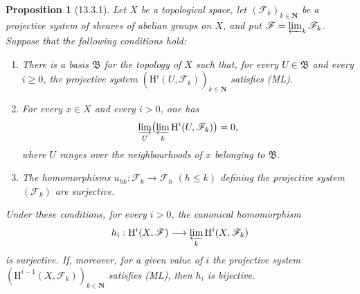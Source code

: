\documentclass[oneside]{amsart}
\theoremstyle{ega-env-style}
\theoremstyle{ega-thm-env-style}
\newtheorem*{proposition}{Proposition}
\theoremstyle{ega-defn-env-style}
\def\mathcal{\mathscr}
\def\sh{\mathcal}                   %
\def\bb{\mathbf}                    %
\def\leq{\leqslant}                 %
\def\geq{\geqslant}                 %
\def\HH{\mathrm{H}}                 %
\newcommand{\oldpage}[2][]{{\marginnote{\normalfont{\textbf{#1}~|~#2}}}\ignorespaces}
\let\EGAOriginalLabel\label
\renewcommand{\label}[1]{\phantomsection\EGAOriginalLabel{#1}}
\begin{document}
\begin{proposition}[13.3.1]
\label{0.13.3.1}
\oldpage[0\textsubscript{III}]{68}
Let $X$ be a topological space, let
$(\sh{F}_k)_{k\in\bb{N}}$ be a projective system of sheaves of
abelian groups on $X$, and put
$\sh{F}=\varprojlim_k\sh{F}_k$.
Suppose that the following conditions hold:
\begin{enumerate}
  \item[{\rm(i)}]
  There is a basis $\mathfrak{B}$ for the topology of $X$ such that,
  for every $U\in\mathfrak{B}$ and every $i\geq0$, the projective
  system
  $(\HH^i(U,\sh{F}_k))_{k\in\bb{N}}$ satisfies (ML).

  \item[{\rm(ii)}]
  For every $x\in X$ and every $i>0$, one has
  \[
    \varinjlim_U\bigl(\varprojlim_k
    \HH^i(U,\sh{F}_k)\bigr)=0,
  \]
  where $U$ ranges over the neighbourhoods of $x$ belonging to
  $\mathfrak{B}$.

  \item[{\rm(iii)}]
  The homomorphisms
  $u_{hk}:\sh{F}_k\longrightarrow\sh{F}_h$ $(h\leq k)$ defining the
  projective system $(\sh{F}_k)$ are surjective.
\end{enumerate}
Under these conditions, for every $i>0$, the canonical homomorphism
\[
  h_i:\HH^i(X,\sh{F})
  \longrightarrow
  \varprojlim_k\HH^i(X,\sh{F}_k)
\]
is surjective. If, moreover, for a given value of $i$ the projective
system
$(\HH^{i-1}(X,\sh{F}_k))_{k\in\bb{N}}$ satisfies (ML), then $h_i$ is
bijective.
\end{proposition}
\end{document}
